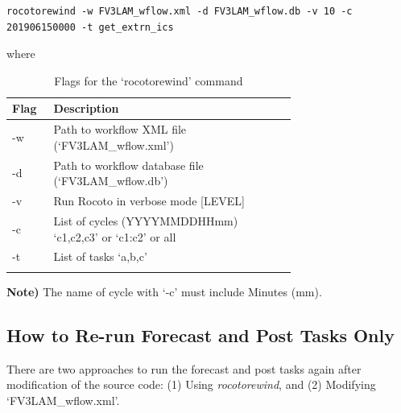 \documentclass[11pt,fleqn]{report}              %
\begin{document}
\lstset{language=bash}   
\begin{lstlisting}[frame=trBL]
rocotorewind -w FV3LAM_wflow.xml -d FV3LAM_wflow.db -v 10 -c 201906150000 -t get_extrn_ics
\end{lstlisting}
where 
{
\fontsize{10}{12}\selectfont
\begin{longtable}{p{0.06\linewidth} | p{0.64\linewidth} }
\hline
\hline
Flag & Description \\
\hline
-w & Path to workflow XML file (`FV3LAM\_wflow.xml') \\
-d & Path to workflow database file (`FV3LAM\_wflow.db') \\
-v & Run Rocoto in verbose mode [LEVEL] \\
-c & List of cycles (YYYYMMDDHHmm) `c1,c2,c3' or `c1:c2' or all \\
-t & List of tasks `a,b,c' \\
\hline
\caption{Flags for the `rocotorewind' command}
\label{table:rocotorewind_flag}
\end{longtable}
}

{\bf Note)} The name of cycle with `-c' must include Minutes (mm).


\subsection{How to Re-run Forecast and Post Tasks Only }
\label{subsec:rerun_fcst_post}

There are two approaches to run the forecast and post tasks again after modification of the source code: (1) Using {\it rocotorewind}, and (2) Modifying `FV3LAM\_wflow.xml'.
\end{document}
